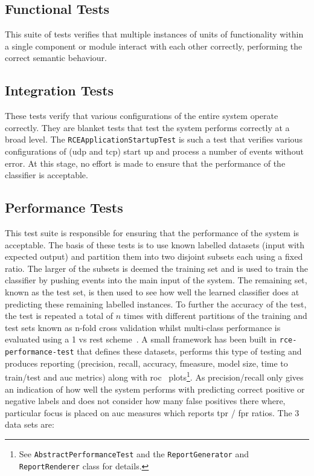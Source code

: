\documentclass[a4paper,11pt]{scrreprt}
\begin{document}
\subsection{Functional Tests}
This suite of tests verifies that multiple instances of units of functionality within a single component or module interact with each other correctly, performing the correct semantic behaviour.
\subsection{Integration Tests}
These tests verify that various configurations of the entire system operate correctly. They are blanket tests that test the system performs correctly at a broad level. The \verb|RCEApplicationStartupTest| is such a test that verifies various configurations of (\acrshort{udp} and \acrshort{tcp}) start up and process a number of events without error. At this stage, no effort is made to ensure that the performance of the classifier is acceptable.
\subsection{Performance Tests}
This test suite is responsible for ensuring that the performance of the system is acceptable. The basis of these tests is to use known labelled datasets (input with expected output) and partition them into two disjoint subsets each using a fixed ratio. The larger of the subsets is deemed the training set and is used to train the classifier by pushing events into the main input of the system. The remaining set, known as the test set, is then used to see how well the learned classifier does at predicting these remaining labelled instances. To further the accuracy of the test, the test is repeated a total of \(n\) times with different partitions of the training and test sets known as n-fold cross validation whilst multi-class performance is evaluated using a 1 vs rest scheme~\cite{flach}. A small framework has been built in \verb|rce-performance-test| that defines these datasets, performs this type of testing and produces reporting (precision, recall, accuracy, fmeasure, model size, time to train/test and \acrshort{auc} metrics) along with \acrshort{roc}~\cite{roc-analysis} plots\footnote{See \verb|AbstractPerformanceTest| and the \verb|ReportGenerator| and \verb|ReportRenderer| class for details.}. As precision/recall only gives an indication of how well the system performs with predicting correct positive or negative labels and does not consider how many false positives there where, particular focus is placed on \acrshort{auc} measures which reports \acrshort{tpr} / \acrshort{fpr} ratios. The 3 data sets are:
\end{document}
